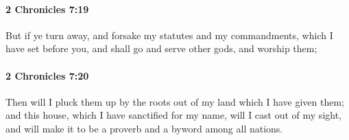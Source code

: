 		\paragraph{2 Chronicles 7:19} %
			\label{2CHRONICLES-7-19}

			But if ye turn away, and forsake my statutes and my commandments, which I have set before you, and shall go and serve other gods, and worship them;


		\paragraph{2 Chronicles 7:20} %
			\label{2CHRONICLES-7-20}

			Then will I pluck them up by the roots out of my land which I have given them; and this house, which I have sanctified for my name, will I cast out of my sight, and will make it to be a proverb and a byword among all nations.

